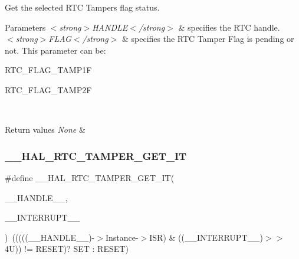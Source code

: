 Get the selected R\+TC Tamper\textquotesingle{}s flag status. 


\begin{DoxyParams}{Parameters}
{\em $<$strong$>$\+H\+A\+N\+D\+L\+E$<$/strong$>$} & specifies the R\+TC handle. \\
\hline
{\em $<$strong$>$\+F\+L\+A\+G$<$/strong$>$} & specifies the R\+TC Tamper Flag is pending or not. This parameter can be\+: \begin{DoxyItemize}
\item R\+T\+C\+\_\+\+F\+L\+A\+G\+\_\+\+T\+A\+M\+P1F \item R\+T\+C\+\_\+\+F\+L\+A\+G\+\_\+\+T\+A\+M\+P2F \end{DoxyItemize}
\\
\hline
\end{DoxyParams}

\begin{DoxyRetVals}{Return values}
{\em None} & \\
\hline
\end{DoxyRetVals}
\mbox{\label{group___r_t_c_ex___tamper_ga20424c15833e5665016e87d1c8a0fdf4}} 
\subsubsection{\texorpdfstring{\+\_\+\+\_\+\+H\+A\+L\+\_\+\+R\+T\+C\+\_\+\+T\+A\+M\+P\+E\+R\+\_\+\+G\+E\+T\+\_\+\+IT}{\_\_HAL\_RTC\_TAMPER\_GET\_IT}}
{\footnotesize\ttfamily \#define \+\_\+\+\_\+\+H\+A\+L\+\_\+\+R\+T\+C\+\_\+\+T\+A\+M\+P\+E\+R\+\_\+\+G\+E\+T\+\_\+\+IT(\begin{DoxyParamCaption}\item[{}]{\+\_\+\+\_\+\+H\+A\+N\+D\+L\+E\+\_\+\+\_\+,  }\item[{}]{\+\_\+\+\_\+\+I\+N\+T\+E\+R\+R\+U\+P\+T\+\_\+\+\_\+ }\end{DoxyParamCaption})~(((((\+\_\+\+\_\+\+H\+A\+N\+D\+L\+E\+\_\+\+\_\+)-\/$>$Instance-\/$>$I\+SR) \& ((\+\_\+\+\_\+\+I\+N\+T\+E\+R\+R\+U\+P\+T\+\_\+\+\_\+)$>$$>$ 4\+U)) != R\+E\+S\+E\+T)? S\+E\+T \+: R\+E\+S\+E\+T)}



